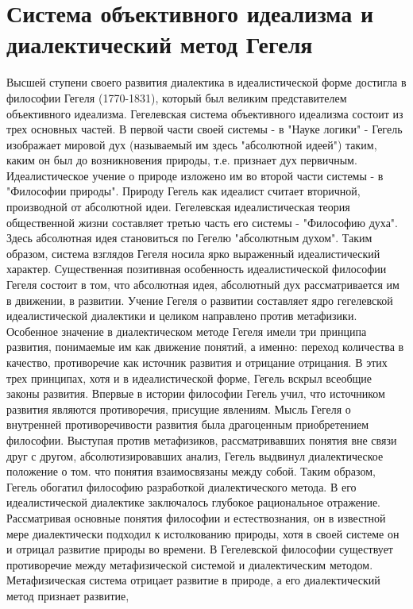 \documentclass[12pt]{article}
\begin{document}
\section{Система объективного идеализма и диалектический метод Гегеля}
Высшей  ступени  своего  развития  диалектика  в  идеалистической  форме  достигла  в  философии  Гегеля
(1770-1831), который был великим представителем объективного идеализма. Гегелевская система объективного
идеализма состоит из трех основных частей.
В первой части своей системы - в "Науке логики" - Гегель изображает мировой дух (называемый им здесь
"абсолютной идеей") таким, каким он был до возникновения природы, т.е. признает дух первичным.
Идеалистическое учение о природе изложено им во второй части системы - в "Философии природы". Природу
Гегель как идеалист считает вторичной, производной от абсолютной идеи.
Гегелевская идеалистическая теория общественной жизни составляет третью часть его системы - "Философию
духа". Здесь абсолютная идея становиться по Гегелю "абсолютным духом".
Таким образом, система взглядов Гегеля носила ярко выраженный идеалистический характер. Существенная
позитивная особенность идеалистической философии Гегеля состоит в том, что абсолютная идея, абсолютный
дух  рассматривается  им  в  движении,  в  развитии.  Учение  Гегеля  о  развитии  составляет  ядро  гегелевской
идеалистической диалектики и целиком направлено против метафизики. Особенное значение в диалектическом
методе  Гегеля  имели  три  принципа  развития,  понимаемые  им  как  движение  понятий,  а  именно:  переход
количества в качество, противоречие как источник развития и отрицание отрицания.
В этих трех принципах, хотя и в идеалистической форме, Гегель вскрыл всеобщие законы развития. Впервые в
истории философии Гегель учил, что источником развития являются противоречия, присущие явлениям. Мысль
Гегеля о внутренней противоречивости развития была драгоценным приобретением философии.
Выступая  против  метафизиков,  рассматривавших  понятия  вне  связи  друг  с  другом,  абсолютизировавших 
анализ, Гегель выдвинул диалектическое положение о том. что понятия взаимосвязаны между собой. Таким
образом, Гегель обогатил философию разработкой диалектического метода. В его идеалистической диалектике
заключалось глубокое рациональное отражение. Рассматривая основные понятия философии и естествознания,
он в известной мере диалектически подходил к истолкованию природы, хотя в своей системе он и отрицал
развитие природы во времени.
В  Гегелевской  философии  существует  противоречие  между  метафизической  системой  и  диалектическим
методом. Метафизическая система отрицает развитие в природе, а его диалектический метод признает развитие,
\end{document}
